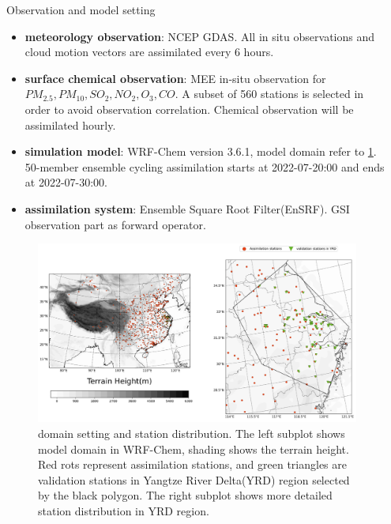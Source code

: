 \documentclass[final]{beamer}
\newlength{\sepwidth}
\newlength{\colwidth}
\newcommand{\separatorcolumn}{\begin{column}{\sepwidth}\end{column}}
\begin{document}
\begin{frame}[t]
\begin{columns}
	\end{columns}

	\begin{columns}[t]
		\separatorcolumn
		
		\begin{column}{\colwidth}
			
			\begin{block}{Observation and model setting}
                \begin{itemize}
     
					\item \textbf{meteorology observation}: NCEP GDAS. All in situ observations and cloud motion vectors are assimilated every 6 hours. 
     
					\item \textbf{surface chemical observation}: MEE in-situ observation for $PM_{2.5}, PM_{10}, SO_2, NO_2, O_3, CO$. A subset of 560 stations is selected in order to avoid observation correlation. Chemical observation will be assimilated hourly.
     
					\item \textbf{simulation model}: WRF-Chem version 3.6.1, model domain refer to \cref{fig1}. 50-member ensemble cycling assimilation starts at 2022-07-20:00 and ends at 2022-07-30:00.

					\item \textbf{assimilation system}: Ensemble Square Root Filter(EnSRF). GSI observation part as forward operator.
     
				\end{itemize}
                \begin{figure}
                    \centerline{\includegraphics[width=0.8\colwidth,angle=0]{figure/domain_station_split.png}}
                    \caption{domain setting and station distribution. The left subplot shows model domain in WRF-Chem, shading shows the terrain height. Red rots represent assimilation stations, and green triangles are validation stations in Yangtze River Delta(YRD) region selected by the black polygon. The right subplot shows more detailed station distribution in YRD region.  }\label{fig1}
                \end{figure}


\end{block}
\end{column}
\end{columns}
\end{frame}
\end{document}
